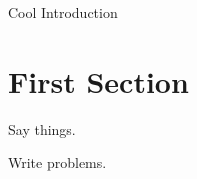 \label{lab:spgrid}



Cool Introduction


\section*{First Section}

Say things.

\begin{problem}
Write problems.
\end{problem}